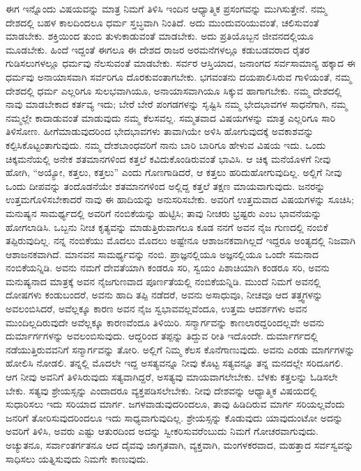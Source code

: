 \vskip 2pt

ಈಗ ಇನ್ನೊಂದು ವಿಷಯವನ್ನು ಮಾತ್ರ ನಿಮಗೆ ತಿಳಿಸಿ ಇಂದಿನ ಆಧ್ಯಾತ್ಮಿಕ ಪ್ರಸಂಗವನ್ನು ಮುಗಿಸುತ್ತೇನೆ. ನಮ್ಮ ದೇಶದಲ್ಲಿ ಬಹಳ ಕಾಲದಿಂದಲೂ ಧರ್ಮ ಸ್ತಬ್ಧವಾಗಿ ನಿಂತಿದೆ. ಅದು ಮುಂದುವರಿಯುವಂತೆ, ಚಲಿಸುವಂತೆ ಮಾಡಬೇಕು. ಶಕ್ತಿಯಿಂದ ತುಂಬಿ ತುಳುಕಾಡುವಂತೆ ಮಾಡಬೇಕು. ಅದು ಪ್ರತಿಯೊಬ್ಬನ ಜೀವನದಲ್ಲಿಯೂ ಮೂಡಬೇಕು. ಹಿಂದೆ ಇದ್ದಂತೆ ಈಗಲೂ ಈ ದೇಶದ ರಾಜರ ಅರಮನೆಗಳಲ್ಲೂ ಕಡುಬಡವರಾದ ರೈತರ ಗುಡಿಸಲುಗಳಲ್ಲೂ ಧರ್ಮವು ನೆಲಸುವಂತೆ ಮಾಡಬೇಕು. ಸರ್ವರ ಆಸ್ತಿಯಾದ, ಜನಾಂಗದ ಸರ್ವಸಾಮಾನ್ಯ ಹಕ್ಕಾದ ಈ ಧರ್ಮವು ಅನಾಯಾಸವಾಗಿ ಸರ್ವರಿಗೂ ದೊರಕುವಂತಾಗಬೇಕು. ಭಗವಂತನು ದಯಪಾಲಿಸಿರುವ ಗಾಳಿಯಂತೆ, ನಮ್ಮ ದೇಶದಲ್ಲಿ ಧರ್ಮ ಎಲ್ಲರಿಗೂ ಸುಲಭವಾಗಿಯೂ, ಅನಾಯಾಸವಾಗಿಯೂ ಸಿಕ್ಕುವ ಹಾಗಾಗಬೇಕು. ನಮ್ಮ ದೇಶದಲ್ಲಿ ನಾವು ಮಾಡಬೇಕಾದ ಕರ್ತವ್ಯ ಇದು; ಬೇರೆ ಬೇರೆ ಪಂಗಡಗಳನ್ನು ಸೃಷ್ಟಿಸಿ ನಮ್ಮ ಭೇದಭಾವಗಳ ಸಾಧನೆಗಾಗಿ, ನಮ್ಮ ನಮ್ಮಲ್ಲೇ ಕಾದಾಡುವಂತೆ ಮಾಡುವುದು ನಮ್ಮ ಕೆಲಸವಲ್ಲ. ಸಮ್ಮತವಾದ ವಿಷಯಗಳನ್ನು ಮಾತ್ರ ಎಲ್ಲರಿಗೂ ಸಾರಿ ತಿಳಿಸೋಣ. ಹೀಗೆ\break ಮಾಡುವುದರಿಂದ ಭೇದಭಾವಗಳು ತಾವಾಗಿಯೇ ಅಳಿಸಿ ಹೋಗುವುದಕ್ಕೆ ಅವಕಾಶವನ್ನು ಕಲ್ಪಿಸಿಕೊಟ್ಟಂತಾಗುವುದು. ನಮ್ಮ ದೇಶಬಾಂಧವರಿಗೆ ನಾನು ಬಾರಿ ಬಾರಿಗೂ ಹೇಳುವ ವಿಷಯ ಇದು. ಒಂದು ಚಿಕ್ಕಮನೆಯಲ್ಲಿ ಅನೇಕ ಶತಮಾನಗಳಿಂದ ಕತ್ತಲೆ ಕವಿದುಕೊಂಡಿರುವಂತೆ ಭಾವಿಸಿ. ಆ ಚಿಕ್ಕ ಮನೆಯೊಳಗೆ ನೀವು ಹೋಗಿ, “ಅಯ್ಯೋ, ಕತ್ತಲು, ಕತ್ತಲು” ಎಂದು ಗೊಣಗಾಡಿದರೆ, ಆ ಕತ್ತಲು ಹರಿದುಹೋಗುವುದಿಲ್ಲ. ಅಲ್ಲಿಗೆ ನೀವು ಒಂದು ದೀಪವನ್ನು ತಂದೊಡನೆಯೇ ಶತಮಾನಗಳಿಂದ ಅಲ್ಲಿದ್ದ ಕತ್ತಲೆ ತಕ್ಷಣ ಮಾಯವಾಗುವುದು. ಜನರನ್ನು ಉತ್ತಮಗೊಳಿಸಬೇಕಾದರೆ ನಾವು ಈ ಹಾದಿಯನ್ನು ಅನುಸರಿಸಬೇಕು. ಅವರಿಗೆ ಉತ್ತಮವಾದ ವಿಷಯಗಳನ್ನು ಸೂಚಿಸಿ; ಮನುಷ್ಯನ ಸಾಮರ್ಥ್ಯದಲ್ಲಿ ಅವರಿಗೆ ನಂಬಿಕೆಯನ್ನು ಹುಟ್ಟಿಸಿ; ತಾವು ನೀಚರು ಭ್ರಷ್ಟರು ಎಂಬ ಭಾವನೆಯನ್ನು ಹೋಗಲಾಡಿಸಿ. ಒಬ್ಬನು ನೀಚ ಕೃತ್ಯವನ್ನು ಮಾಡುತ್ತಿರುವಾಗಲೂ ಕೂಡ ನನಗೆ ಅವನ ನೈಜ ಗುಣದಲ್ಲಿ ನಂಬಿಕೆ ತಪ್ಪಿರುವುದಿಲ್ಲ. ನನ್ನ ನಂಬಿಕೆಯು ಮೊದಲು ಮೊದಲು ಅಷ್ಟೇನೂ ಆಶಾಜನಕವಾಗಿಲ್ಲದೆ ಇದ್ದರೂ ಅಂತ್ಯದಲ್ಲಿ ನಿಜವಾಗಿ ಆಶಾಜನಕವಾಗಿದೆ. ಮಾನವನ ಸಾಮರ್ಥ್ಯವನ್ನು ನಂಬಿ. ಪ್ರಾಜ್ಞನಲ್ಲಿಯೂ ಅಜ್ಞನಲ್ಲಿಯೂ ಒಂದೇ ಸಮನಾದ ನಂಬಿಕೆಯನ್ನಿಡಿ. ಅವನು ನಮಗೆ ದೇವತೆಯಾಗಿ ಕಂಡರೂ ಸರಿ, ಸ್ವಯಂ ಪಿಶಾಚಿಯಾಗಿ ಕಂಡರೂ ಸರಿ, ಅವನು ಮನುಷ್ಯನಾದ ಮಾತ್ರಕ್ಕೆ ಅವನ ನೈಜಗುಣವಾದ ಪೂರ್ಣತೆಯಲ್ಲಿ ನಂಬಿಕೆಯನ್ನಿಡಿ. ಮುಂದೆ ನಿಮಗೆ ಅವನಲ್ಲಿ ದೋಷಗಳು ಕಂಡುಬಂದರೆ, ಅವನು ಹಾದಿ ತಪ್ಪಿ ನಡೆದರೆ, ಅವನು ಅಸಾಧುವೂ, ನೀಚವೂ ಆದ ತತ್ತ್ವಗಳನ್ನು ಅವಲಂಬಿಸಿದರೆ, ಅವೆಲ್ಲಕ್ಕೂ ಕಾರಣ ಅವನ ನೈಜ ಸ್ವಭಾವವಲ್ಲವೆಂದೂ, ಉತ್ತಮ ಆದರ್ಶಗಳು ಅವನ ಮುಂದಿಲ್ಲದಿರುವುದೇ ಅವೆಲ್ಲಕ್ಕೂ ಕಾರಣವೆಂದೂ ತಿಳಿಯಿರಿ. ಸನ್ಮಾರ್ಗವನ್ನು ಕಾಣಲಾರದ್ದರಿಂದಲ್ಲವೇ ಅವನು ದುರ್ಮಾರ್ಗಗಳನ್ನು ಅವಲಂಬಿಸುವುದು. ಆದ್ದರಿಂದ ತಪ್ಪನ್ನು ತಿದ್ದುವ ರೀತಿ ಇದೊಂದೇ. ದುರ್ಮಾರ್ಗದಲ್ಲಿ ನಡೆಯುತ್ತಿರುವವನಿಗೆ ಸನ್ಮಾರ್ಗವನ್ನು ತೋರಿ. ಅಲ್ಲಿಗೆ ನಿಮ್ಮ ಕೆಲಸ ಕೊನೆಗಾಣುವುದು. ಅವನು ಎರಡು ಮಾರ್ಗಗಳನ್ನು ಹೋಲಿಸಿ ನೋಡಲಿ. ತನ್ನಲ್ಲಿ ಮೊದಲೇ ಇದ್ದ ಅಸತ್ಯವನ್ನೂ ನೀವು ಕೊಟ್ಟ ಸತ್ಯವನ್ನೂ ತನ್ನ ಮನದಲ್ಲೇ ಸರಿದೂಗಲಿ. ಆಗ ನೀವು ಅವನಿಗೆ ತಿಳಿಸಿರುವುದು ಸತ್ಯವಾಗಿದ್ದರೆ, ಅಸತ್ಯವು ಮಾಯವಾಗಲೇಬೇಕು. ಬೆಳಕು ಕತ್ತಲನ್ನು ಓಡಿಸಲೇ ಬೇಕು. ಸತ್ಯವು ಶ್ರೇಯಸ್ಸನ್ನು ಎಂದಾದರೂ ವ್ಯಕ್ತಪಡಿಸಲೇಬೇಕು. ನೀವು ದೇಶವನ್ನು ಆಧ್ಯಾತ್ಮಿಕ ವಿಷಯದಲ್ಲಿ ಸುಧಾರಿಸಲು ಇದು ಸರಿಯಾದ ಮಾರ್ಗ. ಜಗಳವಾಡುವುದರಿಂದಲೂ, ತಾವು ಹಿಡಿದಿರುವ ಮಾರ್ಗ ಸರಿಯಲ್ಲವೆಂದು ಜನರಿಗೆ ತೋರಿಸುವುದರಿಂದಲೂ ಇದು ಸಾಧ್ಯವಾಗುವುದಿಲ್ಲ. ಶ್ರೇಯಸ್ಸನ್ನು ಕೊಡುವುದು ಯಾವುದುಂಟೋ ಅದನ್ನು ಅವರಿಗೆ ತಿಳಿಸಿ, ಅವರು ಎಷ್ಟು ಆತುರದಿಂದ ಅದನ್ನು ಸ್ವೀಕರಿಸುವರೆಂಬುದು ನಿಮಗೆ ಗೋಚರವಾಗುವುದು. ಅಚ್ಯುತನೂ, ಸರ್ವಾಂತರ್ಗತನೂ ಆದ ದೈವವು ಜಾಗೃತವಾಗಿ, ವ್ಯಕ್ತವಾಗಿ, ಮಂಗಳಕರವಾದ, ಮಹತ್ತಾದ ಸರ್ವಸ್ವವನ್ನು ಸಾಧಿಸಲು ಯತ್ನಿಸುವುದು ನಿಮಗೇ ಕಾಣುವುದು.

